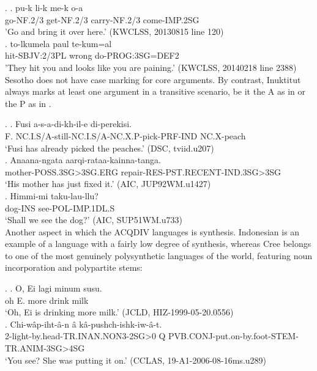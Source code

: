 \documentclass[a4paper, 11pt]{book}
\newcommand{\source}[1]{\hfill (#1)\\[-0.2cm]}	%
\begin{document}
\ex.
	\ag. pu-k		li-k		me-k			o-a \\ 
		go-NF.2/3	get-NF.2/3	carry-NF.2/3		come-IMP.2SG \\
		'Go and bring it over here.' \source{KWCLSS, 20130815 line 120}
	\bg. 	to-lkumela		paul		te-kum=al \\
		hit-SBJV:2/3PL	wrong		do-PROG:3SG=DEF2 \\
		'They hit you and looks like you are paining.' \source{KWCLSS, 20140218 line 2388}


Sesotho \Next[a] does not have case marking for core arguments. By contrast, Inuktitut always marks at least one argument in a transitive scenario, be it the A as in \Next[b] or the P as in \Next[c]. 

\ex.
	\ag. Fusi a-s-a-di-kh-il-e di-perekisi. \\
		F. NC.I.S/A-still-NC.I.S/A-NC.X.P-pick-PRF-IND NC.X-peach \\
		‘Fusi has already picked the peaches.’ \source{DSC, tviid.u207}
	\bg. Anaana-ngata aarqi-rataa-kainna-tanga. \\
		mother-POSS.3SG>3SG.ERG repair-RES-PST.RECENT-IND.3SG>3SG \\
		‘His mother has just fixed it.’ \source{AIC, JUP92WM.u1427}
	\cg. Himmi-mi taku-lau-llu? \\
		dog-INS see-POL-IMP.1DL.S \\
		‘Shall we see the dog?’ \source{AIC, SUP51WM.u733}


Another aspect in which the ACQDIV languages is synthesis. Indonesian \Next[a] is an example of a language with a fairly low degree of synthesis, whereas Cree \Next[b] belongs to one of the most genuinely polysynthetic languages of the world, featuring noun incorporation and polypartite stems: 

\ex.
	\ag. O, Ei lagi minum susu. \\
		oh E. more drink milk  \\
		‘Oh, Ei is drinking more milk.’ \source{JCLD, HIZ-1999-05-20.0556}
	\bg. Chi-wâp-iht-â-n â kâ-pushch-ishk-iw-â-t. \\
		2-light-by.head-TR.INAN.NON3-2SG>0 Q PVB.CONJ-put.on-by.foot-STEM-TR.ANIM-3SG>4SG \\
		‘You see? She was putting it on.’ \source{CCLAS, 19-A1-2006-08-16ms.u289}
\end{document}

